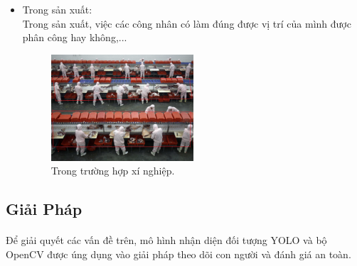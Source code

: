 \begin{flushleft}
\begin{itemize}
        \item Trong sản xuất:\\
        Trong sản xuất, việc các công nhân có làm đúng được vị trí của mình được phân công hay không,...
        \begin{figure}[htbp]
            \centering
            \includegraphics[width=0.5\textwidth]{images/TH3.jpg}
            \caption{Trong trường hợp xí nghiệp.}
            \label{fig:img_3_XN}
        \end{figure}
    \end{itemize}
    

    
    \subsection{Giải Pháp}
    \fontsize{13}{13}\selectfont\paragraph{}
    Để giải quyết các vấn đề trên, mô hình nhận diện đối tượng YOLO và bộ OpenCV được úng dụng vào giải pháp theo dõi con người và đánh giá an toàn. \\
    
\end{flushleft}